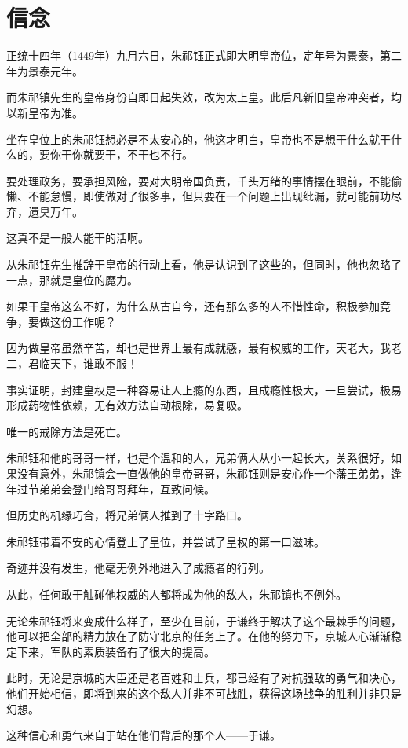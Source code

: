 \section{信念}
\ifnum{}
	\begin{multicols}{\theparacolNo}
\fi
正统十四年（1449年）九月六日，朱祁钰正式即大明皇帝位，定年号为景泰，第二年为景泰元年。

而朱祁镇先生的皇帝身份自即日起失效，改为太上皇。此后凡新旧皇帝冲突者，均以新皇帝为准。

坐在皇位上的朱祁钰想必是不太安心的，他这才明白，皇帝也不是想干什么就干什么的，要你干你就要干，不干也不行。

要处理政务，要承担风险，要对大明帝国负责，千头万绪的事情摆在眼前，不能偷懒、不能怠慢，即使做对了很多事，但只要在一个问题上出现纰漏，就可能前功尽弃，遗臭万年。

这真不是一般人能干的活啊。

从朱祁钰先生推辞干皇帝的行动上看，他是认识到了这些的，但同时，他也忽略了一点，那就是皇位的魔力。

如果干皇帝这么不好，为什么从古自今，还有那么多的人不惜性命，积极参加竞争，要做这份工作呢？

因为做皇帝虽然辛苦，却也是世界上最有成就感，最有权威的工作，天老大，我老二，君临天下，谁敢不服！

事实证明，封建皇权是一种容易让人上瘾的东西，且成瘾性极大，一旦尝试，极易形成药物性依赖，无有效方法自动根除，易复吸。

唯一的戒除方法是死亡。

朱祁钰和他的哥哥一样，也是个温和的人，兄弟俩人从小一起长大，关系很好，如果没有意外，朱祁镇会一直做他的皇帝哥哥，朱祁钰则是安心作一个藩王弟弟，逢年过节弟弟会登门给哥哥拜年，互致问候。

但历史的机缘巧合，将兄弟俩人推到了十字路口。

朱祁钰带着不安的心情登上了皇位，并尝试了皇权的第一口滋味。

奇迹并没有发生，他毫无例外地进入了成瘾者的行列。

从此，任何敢于触碰他权威的人都将成为他的敌人，朱祁镇也不例外。

无论朱祁钰将来变成什么样子，至少在目前，于谦终于解决了这个最棘手的问题，他可以把全部的精力放在了防守北京的任务上了。在他的努力下，京城人心渐渐稳定下来，军队的素质装备有了很大的提高。

此时，无论是京城的大臣还是老百姓和士兵，都已经有了对抗强敌的勇气和决心，他们开始相信，即将到来的这个敌人并非不可战胜，获得这场战争的胜利并非只是幻想。

这种信心和勇气来自于站在他们背后的那个人——于谦。


\end{multicols}
